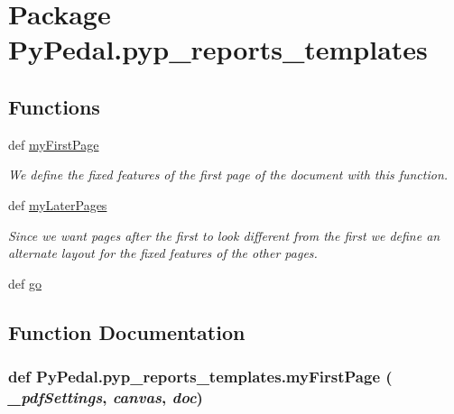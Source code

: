\hypertarget{namespacePyPedal_1_1pyp__reports__templates}{
\section{Package Py\-Pedal.pyp\_\-reports\_\-templates}
\label{namespacePyPedal_1_1pyp__reports__templates}
}


\subsection*{Functions}
\begin{CompactItemize}
\item 
def \hyperlink{namespacePyPedal_1_1pyp__reports__templates_61833ce45b0d6f67c926a0f184a91fb5}{my\-First\-Page}
\begin{CompactList}\small\item\em We define the fixed features of the first page of the document with this function. \item\end{CompactList}\item 
def \hyperlink{namespacePyPedal_1_1pyp__reports__templates_87a5529fdb00426f8c8bbda1ac856bda}{my\-Later\-Pages}
\begin{CompactList}\small\item\em Since we want pages after the first to look different from the first we define an alternate layout for the fixed features of the other pages. \item\end{CompactList}\item 
\hypertarget{namespacePyPedal_1_1pyp__reports__templates_0413b7ca3d6a16cf34b21cfaa03e9833}{
def \hyperlink{namespacePyPedal_1_1pyp__reports__templates_0413b7ca3d6a16cf34b21cfaa03e9833}{go}}
\label{namespacePyPedal_1_1pyp__reports__templates_0413b7ca3d6a16cf34b21cfaa03e9833}

\end{CompactItemize}


\subsection{Function Documentation}
\hypertarget{namespacePyPedal_1_1pyp__reports__templates_61833ce45b0d6f67c926a0f184a91fb5}{
\subsubsection[myFirstPage]{\setlength{\rightskip}{0pt plus 5cm}def Py\-Pedal.pyp\_\-reports\_\-templates.my\-First\-Page ( {\em \_\-pdf\-Settings},  {\em canvas},  {\em doc})}}
\label{namespacePyPedal_1_1pyp__reports__templates_61833ce45b0d6f67c926a0f184a91fb5}


